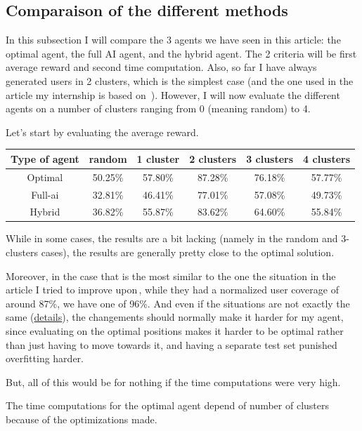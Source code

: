 \documentclass[letterpaper]{article}
\begin{document}
\subsection{Comparaison of the different methods}

In this subsection I will compare the 3 agents we have seen in this article: the optimal agent, the full AI agent, and the hybrid agent.
The 2 criteria will be first average reward and second time computation.
Also, so far I have always generated users in 2 clusters, which is the simplest case (and the one used in the article my internship is based on \,\cite{main_article}).
However, I will now evaluate the different agents on a number of clusters ranging from 0 (meaning random) to 4.

Let's start by evaluating the average reward.

\begin{center}
    \begin{tabular}{|c|c|c|c|c|c|}
    \hline 
     Type of agent & random & 1 cluster & 2 clusters & 3 clusters & 4 clusters \\ 
     \hline
     Optimal & 50.25\% & 57.80\% & 87.28\% & 76.18\% & 57.77\% \\  
     \hline
     Full-ai & 32.81\% & 46.41\% & 77.01\% & 57.08\% & 49.73\%  \\
     \hline
     Hybrid &  36.82\% & 55.87\% & 83.62\% & 64.60\% & 55.84\%  \\
     \hline
    \end{tabular}
\end{center}

While in some cases, the results are a bit lacking (namely in the random and 3-clusters cases), the results are generally pretty close to the optimal solution.

Moreover, in the case that is the most similar to the one the situation in the article I tried to improve upon\,\cite{main_article}, while they had a normalized user coverage
of around 87\%, we have one of 96\%. And even if the situations are not exactly the same (\hyperref[reinforcement]{details}), the changements should normally make it harder for my agent,
since evaluating on the optimal positions makes it harder to be optimal rather than just having to move towards it,
and having a separate test set punished overfitting harder.

But, all of this would be for nothing if the time computations were very high.

The time computations for the optimal agent depend of number of clusters because of the optimizations made.
\end{document}
